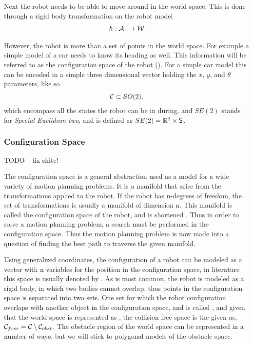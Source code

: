 Next the robot needs to be able to move around in the world space. This is done
through a rigid body transformation on the robot model
\[
  h : \mathcal{A}\ \rightarrow \mathcal{W}
\]

However, the robot is more than a set of points in the world space. For example
a simple model of a car needs to know its heading as well. This information will
be referred to as the configuration space of the robot
(\modelconfigurationspace). For a simple car model this can be encoded in a
simple three dimensional vector holding the \(x\), \(y\), and \(\theta\)
parameters, like so
\[
  \mathcal{C} \subset SO(2),
\]
which encompass all the states the robot can be in during, and \(SE(2)\) stands
for \textit{Special Euclidean two}, and is defined as \(SE(2) = \mathbb{R}^2 \times
\mathsf{S}\).

\subsubsection{Configuration Space}

TODO -- fix shite!

The configuration space is a general abstraction used as a model for a wide
variety of motion planning problems. It is a manifold that arise from the
transformations applied to the robot. If the robot has n-degrees of freedom, the
set of transformations is usually a manifold of dimension n. This manifold is
called the configuration space of the robot, and is shortened
\modelconfigurationspace{}. Thus in order to solve a motion planning problem, a
search must be performed in the configuration space. Thus the motion planning
problem is now made into a question of finding the best path to traverse the
given manifold\cite{Lav06}.

Using generalized coordinates, the configuration of a robot can be modeled as a
vector with n variables for the position in the configuration space, in
literature this space is usually denoted by \modelconfigurationspace{}. As is
most common, the robot is modeled as a rigid body, in which two bodies cannot
overlap, thus points in the configuration space is separated into two sets. One
set for which the robot configuration overlaps with another object in the
configuration space, and is called \modelconfigurationspaceobst{}, and given
that the world space is represented as \modelconfigurationspace{}, the collision
free space is the given as, \(\mathcal{C}_{free} =
\mathcal{C} \setminus \mathcal{C}_{obst}\). The obstacle
region of the world space can be represented in a number of ways, but we will
stick to polygonal models of the obstacle space.

